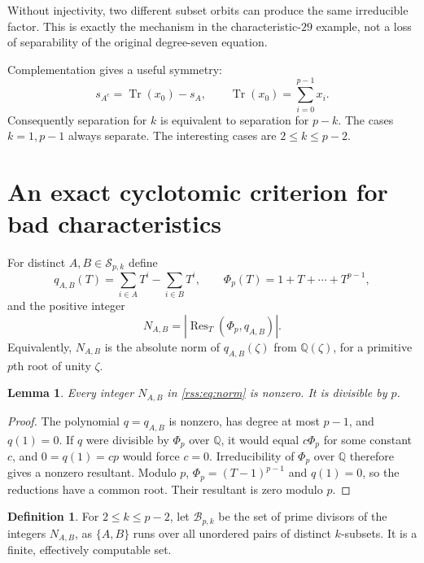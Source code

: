 \documentclass[11pt,a4paper]{article}
\newtheorem{lemma}[theorem]{Lemma}
\theoremstyle{definition}
\newtheorem{definition}[theorem]{Definition}
\theoremstyle{remark}
\newcommand{\Q}{\mathbb Q}
\newcommand{\Res}{\operatorname{Res}}
\begin{document}
Without injectivity, two different subset orbits can produce the same
irreducible factor. This is exactly the mechanism in the characteristic-$29$
example, not a loss of separability of the original degree-seven equation.

Complementation gives a useful symmetry:
\[
 s_{A^c}=\operatorname{Tr}(x_0)-s_A,
 \qquad \operatorname{Tr}(x_0)=\sum_{i=0}^{p-1}x_i.
\]
Consequently separation for $k$ is equivalent to separation for $p-k$.
The cases $k=1,p-1$ always separate. The interesting cases are
$2\leq k\leq p-2$.

\section{An exact cyclotomic criterion for bad characteristics}
\label{rss:sec:criterion}

For distinct $A,B\in\mathcal S_{p,k}$ define
\begin{equation}
 q_{A,B}(T)=\sum_{i\in A}T^i-\sum_{i\in B}T^i,
 \qquad \Phi_p(T)=1+T+\cdots+T^{p-1},
 \label{rss:eq:q}
\end{equation}
and the positive integer
\begin{equation}
 N_{A,B}=\left|\Res_T(\Phi_p,q_{A,B})\right|.
 \label{rss:eq:norm}
\end{equation}
Equivalently, $N_{A,B}$ is the absolute norm of $q_{A,B}(\zeta)$ from
$\Q(\zeta)$, for a primitive $p$th root of unity $\zeta$.

\begin{lemma}\label{rss:lem:normnonzero}
Every integer $N_{A,B}$ in \eqref{rss:eq:norm} is nonzero. It is divisible by $p$.
\end{lemma}
\begin{proof}
The polynomial $q=q_{A,B}$ is nonzero, has degree at most $p-1$, and
$q(1)=0$. If $q$ were divisible by $\Phi_p$ over $\Q$, it would equal
$c\Phi_p$ for some constant $c$, and $0=q(1)=cp$ would force $c=0$.
Irreducibility of $\Phi_p$ over $\Q$ therefore gives a nonzero resultant.
Modulo $p$, $\Phi_p=(T-1)^{p-1}$ and $q(1)=0$, so the reductions have a
common root. Their resultant is zero modulo $p$.
\end{proof}

\begin{definition}
For $2\leq k\leq p-2$, let $\mathcal B_{p,k}$ be the set of prime divisors
of the integers $N_{A,B}$, as $\{A,B\}$ runs over all unordered pairs of
distinct $k$-subsets. It is a finite, effectively computable set.
\end{definition}
\end{document}
